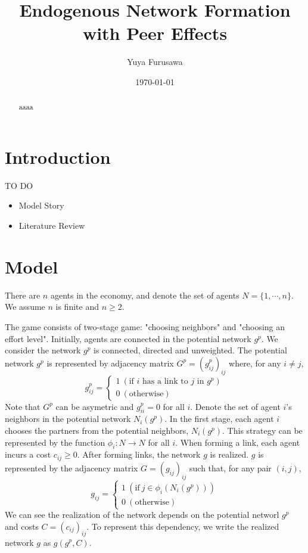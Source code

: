 \documentclass[12pt]{article}
\theoremstyle{definition}
\begin{document}
\title{Endogenous Network Formation with Peer Effects}

\author{Yuya Furusawa}

\date{\today}

\maketitle

\begin{abstract}
aaaa
\end{abstract}


\section{Introduction}

TO DO
\begin{itemize}
  \item Model Story
  \item Literature Review
\end{itemize}


\section{Model}

There are $n$ agents in the economy, and denote the set of agents $N = \{ 1, \cdots, n\}$.
We assume $n$ is finite and $n \ge 2$.

The game consists of two-stage game: "choosing neighbors" and "choosing an effort level".
Initially, agents are connected in the potential network $g^p$.
We consider the network $g^p$ is connected, directed and unweighted.
The potential network $g^p$ is represented by adjacency matrix $G^p = {(g_{ij}^p)}_{ij}$ where, for any $i \neq j$,
\[ g_{ij}^p =
	\begin{cases}
		1 \  (\text{if $i$ has a link to $j$ in $g^p $}) \\
		0 \  (\text{otherwise})
	\end{cases} \]
Note that $G^p$ can be asymetric and $g_{ii}^p = 0$ for all $i$.
Denote the set of agent $i$'s neighbors in the potential network $N_i(g^p)$.
In the first stage, each agent $i$ chooses the partners from the potential neighbors, $N_i(g^p)$.
This strategy can be represented by the function $\phi_i : N \rightarrow N$ for all $i$.
When forming a link, each agent incurs a cost $c_{ij} \ge 0$.
After forming links, the network $g$ is realized.
$g$ is represented by the adjacency matrix $G = {(g_{ij})}_{ij}$ such that, for any pair $(i,j)$,
\[ g_{ij} = 
	\begin{cases}
		1 \  (\text{if} \  j \in \phi_i(N_i(g^p)) ) \\
		0 \  (\text{otherwise})
	\end{cases} \]
We can see the realization of the network depends on the potential networl $g^p$ and costs $C = {(c_{ij})}_{ij}$.
To represent this dependency, we write the realized network $g$ as $g(g^p, C)$.
\end{document}
